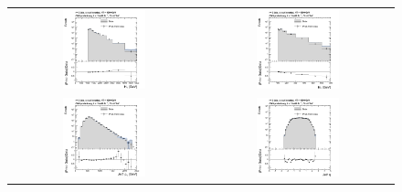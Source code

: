 \begin{figure}[h]
  \centering
  \begin{tabular}{cc}
                \includegraphics[width=0.45\textwidth]{figures/HT_presel_HThigh_chsJets_535_Run2012ABCD_data_pt10_withUncertainties_UseRebCorrection_v3.png} &
                \includegraphics[width=0.45\textwidth]{figures/MHT_presel_HThigh_chsJets_535_Run2012ABCD_data_pt10_withUncertainties_UseRebCorrection_v3.png}\\
                \includegraphics[width=0.45\textwidth]{figures/Jet1Pt_presel_HThigh_chsJets_535_Run2012ABCD_data_pt10_withUncertainties_UseRebCorrection_v3.png} &
                \includegraphics[width=0.45\textwidth]{figures/Jet1Eta_presel_HThigh_chsJets_535_Run2012ABCD_data_pt10_withUncertainties_UseRebCorrection_v3.png}\\

\end{tabular}
\end{figure}
